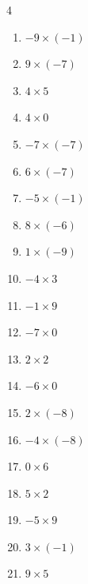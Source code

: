 \begin{multicols}{4}
\begin{enumerate}
  \item $-9\times (-1)$
        \phantom{$=9$}

  \item $9\times (-7)$
        \phantom{$=-63$}

  \item $4\times 5$
        \phantom{$=20$}

  \item $4\times 0$
        \phantom{$=0$}

  \item $-7\times (-7)$
        \phantom{$=49$}

  \item $6\times (-7)$
        \phantom{$=-42$}

  \item $-5\times (-1)$
        \phantom{$=5$}

  \item $8\times (-6)$
        \phantom{$=-48$}

  \item $1\times (-9)$
        \phantom{$=-9$}

  \item $-4\times 3$
        \phantom{$=-12$}

  \item $-1\times 9$
        \phantom{$=-9$}

  \item $-7\times 0$
        \phantom{$=0$}

  \item $2\times 2$
        \phantom{$=4$}

  \item $-6\times 0$
        \phantom{$=0$}

  \item $2\times (-8)$
        \phantom{$=-16$}

  \item $-4\times (-8)$
        \phantom{$=32$}

  \item $0\times 6$
        \phantom{$=0$}

  \item $5\times 2$
        \phantom{$=10$}

  \item $-5\times 9$
        \phantom{$=-45$}

  \item $3\times (-1)$
        \phantom{$=-3$}

  \item $9\times 5$
        \phantom{$=45$}


\end{enumerate}
\end{multicols}
